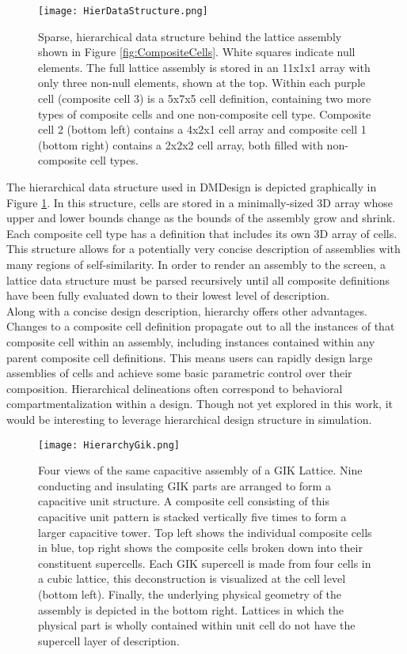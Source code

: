 {\begin{figure}
  \texttt{[image: HierDataStructure.png]}
  \caption{Sparse, hierarchical data structure behind the lattice assembly shown in Figure \ref{fig:CompositeCells}.  White squares indicate null elements.  The full lattice assembly is stored in an 11x1x1 array with only three non-null elements, shown at the top. Within each purple cell (composite cell 3) is a 5x7x5 cell definition, containing two more types of composite cells and one non-composite cell type.  Composite cell 2 (bottom left) contains a 4x2x1 cell array and composite cell 1 (bottom right) contains a 2x2x2 cell array, both filled with non-composite cell types.}
  \label{fig:HierDataStructure}
\end{figure}

The hierarchical data structure used in DMDesign is depicted graphically in Figure \ref{fig:HierDataStructure}.  In this structure, cells are stored in a minimally-sized 3D array whose upper and lower bounds change as the bounds of the assembly grow and shrink.  Each composite cell type has a definition that includes its own 3D array of cells.  This structure allows for a potentially very concise description of assemblies with many regions of self-similarity.  In order to render an assembly to the screen, a lattice data structure must be parsed recursively until all composite definitions have been fully evaluated down to their lowest level of description.\\

Along with a concise design description, hierarchy offers other advantages.  Changes to a composite cell definition propagate out to all the instances of that composite cell within an assembly, including instances contained within any parent composite cell definitions.  This means users can rapidly design large assemblies of cells and achieve some basic parametric control over their composition.    Hierarchical delineations often correspond to behavioral compartmentalization within a design.  Though not yet explored in this work, it would be interesting to leverage hierarchical design structure in simulation.\\

\begin{figure}
  \texttt{[image: HierarchyGik.png]}
  \caption{Four views of the same capacitive assembly of a GIK Lattice.  Nine conducting and insulating GIK parts are arranged to form a capacitive unit structure.  A composite cell consisting of this capacitive unit pattern is stacked vertically five times to form a larger capacitive tower.  Top left shows the individual composite cells in blue, top right shows the composite cells broken down into their constituent supercells.  Each GIK supercell is made from four cells in a cubic lattice, this deconstruction is visualized at the cell level (bottom left).  Finally, the underlying physical geometry of the assembly is depicted in the bottom right.  Lattices in which the physical part is wholly contained within unit cell do not have the supercell layer of description.}
  \label{fig:HierarchyGik}
\end{figure}

}
